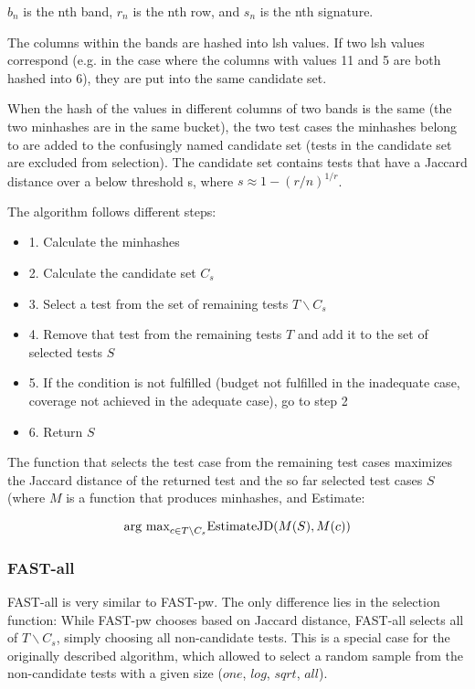 $b_n$ is the nth band, $r_n$ is the nth row, and $s_n$ is the nth
signature.

The columns within the bands are hashed into lsh values. If two lsh
values correspond (e.g. in the case where the columns with values 11
and 5 are both hashed into 6), they are put into the same candidate set.

When the hash of the values in different columns of two bands is the
same (the two minhashes are in the same bucket), the two test cases the
minhashes belong to are added to the confusingly named candidate set
(tests in the candidate set are excluded from selection). The candidate
set contains tests that have a Jaccard distance over a below threshold s,
where $s \approx 1-(r/n)^{1/r}$.

The algorithm follows different steps:

\begin{itemize}
	\item[] 1. Calculate the minhashes
	\item[] 2. Calculate the candidate set $C_s$
	\item[] 3. Select a test from the set of remaining tests $T \backslash C_s$
	\item[] 4. Remove that test from the remaining tests $T$ and add it to the set of selected tests $S$
	\item[] 5. If the condition is not fulfilled (budget not fulfilled in the inadequate case, coverage not achieved in the adequate case), go to step 2
	\item[] 6. Return $S$
\end{itemize}


The function that selects the test case from the remaining test cases
maximizes the Jaccard distance of the returned test and the so far
selected test cases $S$ (where $M$ is a function that produces minhashes, and Estimate:

$$ \hbox{arg max}_{c \in T \backslash C_s} \hbox{EstimateJD}(M(S), M(c))$$

\subsubsection{FAST-all}

FAST-all is very similar to FAST-pw. The only difference lies in the
selection function: While FAST-pw chooses based on Jaccard distance,
FAST-all selects all of $T \backslash C_s$, simply choosing all
non-candidate tests. This is a special case for the originally described
algorithm, which allowed to select a random sample from the non-candidate
tests with a given size ($one$, $log$, $sqrt$, $all$).

